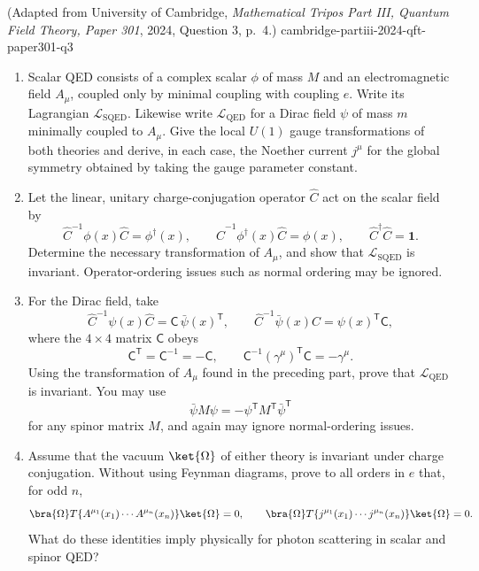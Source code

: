 \begin{enumerate}
  {(Adapted from University of Cambridge, \emph{Mathematical Tripos Part III, Quantum Field Theory, Paper 301}, 2024, Question 3, p.~4.)}
  {cambridge-partiii-2024-qft-paper301-q3}
\begin{enumerate}
\item
Scalar QED consists of a complex scalar \(\phi\) of mass \(M\) and an
electromagnetic field \(A_\mu\), coupled only by minimal coupling with
coupling \(e\).  Write its Lagrangian \(\mathcal L_{\mathrm{SQED}}\).
Likewise write \(\mathcal L_{\mathrm{QED}}\) for a Dirac field \(\psi\) of
mass \(m\) minimally coupled to \(A_\mu\).  Give the local \(U(1)\) gauge
transformations of both theories and derive, in each case, the Noether
current \(j^\mu\) for the global symmetry obtained by taking the gauge
parameter constant.
\item
Let the linear, unitary charge-conjugation operator \(\widehat C\) act on the
scalar field by
\[
 \widehat C^{-1}\phi(x)\widehat C=\phi^\dagger(x),
 \qquad
 \widehat C^{-1}\phi^\dagger(x)\widehat C=\phi(x),
 \qquad \widehat C^\dagger\widehat C=\mathbf 1.
\]
Determine the necessary transformation of \(A_\mu\), and show that
\(\mathcal L_{\mathrm{SQED}}\) is invariant.  Operator-ordering issues such
as normal ordering may be ignored.
\item
For the Dirac field, take
\[
 \widehat C^{-1}\psi(x)\widehat C=\mathsf C\,\bar\psi(x)^{\mathsf T},
 \qquad
 \widehat C^{-1}\bar\psi(x)\widehat C=\psi(x)^{\mathsf T}\mathsf C,
\]
where the \(4\times4\) matrix \(\mathsf C\) obeys
\[
 \mathsf C^{\mathsf T}=\mathsf C^{-1}=-\mathsf C,
 \qquad
 \mathsf C^{-1}(\gamma^\mu)^{\mathsf T}\mathsf C=-\gamma^\mu.
\]
Using the transformation of \(A_\mu\) found in the preceding part, prove
that \(\mathcal L_{\mathrm{QED}}\) is invariant.  You may use
\[
 \bar\psi M\psi=-\psi^{\mathsf T}M^{\mathsf T}\bar\psi^{\mathsf T}
\]
for any spinor matrix \(M\), and again may ignore normal-ordering issues.
\item
Assume that the vacuum \(\ket{\Omega}\) of either theory is invariant under
charge conjugation.  Without using Feynman diagrams, prove to all orders in
\(e\) that, for odd \(n\),
\[
 \bra{\Omega}T\{A^{\mu_1}(x_1)\cdots A^{\mu_n}(x_n)\}\ket{\Omega}=0,
 \qquad
 \bra{\Omega}T\{j^{\mu_1}(x_1)\cdots j^{\mu_n}(x_n)\}\ket{\Omega}=0.
\]
What do these identities imply physically for photon scattering in scalar
and spinor QED?
\end{enumerate}


\end{enumerate}
